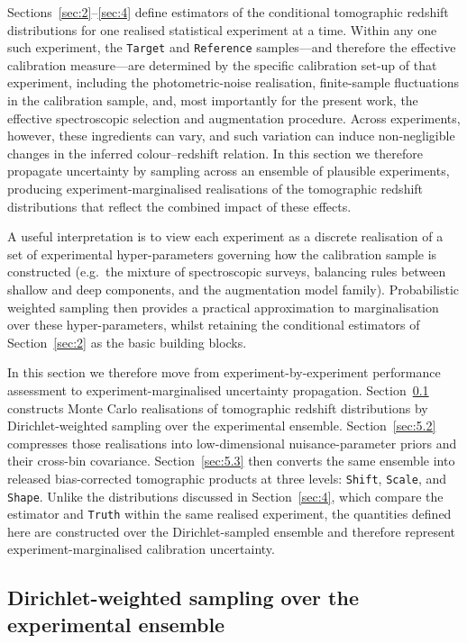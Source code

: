 Sections~\ref{sec:2}--\ref{sec:4} define estimators of the conditional tomographic redshift distributions for one realised statistical experiment at a time. Within any one such experiment, the \texttt{Target} and \texttt{Reference} samples---and therefore the effective calibration measure---are determined by the specific calibration set-up of that experiment, including the photometric-noise realisation, finite-sample fluctuations in the calibration sample, and, most importantly for the present work, the effective spectroscopic selection and augmentation procedure. Across experiments, however, these ingredients can vary, and such variation can induce non-negligible changes in the inferred colour--redshift relation. In this section we therefore propagate uncertainty by sampling across an ensemble of plausible experiments, producing experiment-marginalised realisations of the tomographic redshift distributions that reflect the combined impact of these effects.

A useful interpretation is to view each experiment as a discrete realisation of a set of experimental hyper-parameters governing how the calibration sample is constructed (e.g.\ the mixture of spectroscopic surveys, balancing rules between shallow and deep components, and the augmentation model family). Probabilistic weighted sampling then provides a practical approximation to marginalisation over these hyper-parameters, whilst retaining the conditional estimators of Section~\ref{sec:2} as the basic building blocks.

In this section we therefore move from experiment-by-experiment performance assessment to experiment-marginalised uncertainty propagation. Section~\ref{sec:5.1} constructs Monte Carlo realisations of tomographic redshift distributions by Dirichlet-weighted sampling over the experimental ensemble. Section~\ref{sec:5.2} compresses those realisations into low-dimensional nuisance-parameter priors and their cross-bin covariance. Section~\ref{sec:5.3} then converts the same ensemble into released bias-corrected tomographic products at three levels: \texttt{Shift}, \texttt{Scale}, and \texttt{Shape}. Unlike the distributions discussed in Section~\ref{sec:4}, which compare the estimator and \texttt{Truth} within the same realised experiment, the quantities defined here are constructed over the Dirichlet-sampled ensemble and therefore represent experiment-marginalised calibration uncertainty.

\subsection{Dirichlet-weighted sampling over the experimental ensemble} \label{sec:5.1}

